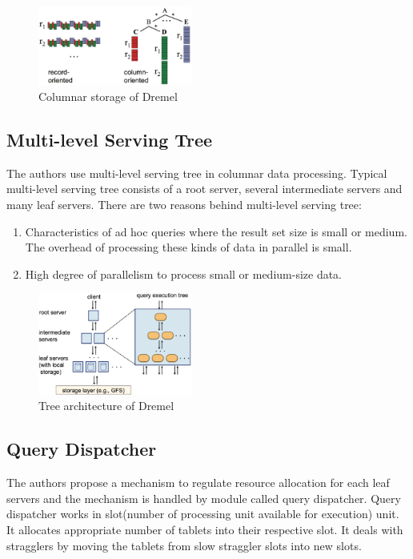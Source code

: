 \documentclass[twocolumn]{article}
\newcommand{\be}{\begin{enumerate}}
\newcommand{\ee}{\end{enumerate}}
\newcommand{\ii}{\item}
\begin{document}
\begin{figure}[htb]
        \centering
        \includegraphics[width=0.45\textwidth]{column-oriented.png}
        \caption{Columnar storage of Dremel}
        \label{fig:column-oriented}
\end{figure}

\subsection{Multi-level Serving Tree}
The authors use multi-level serving tree in columnar data processing. Typical multi-level serving tree consists of a root server, several intermediate servers and many leaf servers. There are two reasons behind multi-level serving tree:
\be
\ii Characteristics of ad hoc queries where the result set size is small or medium. The overhead of processing these kinds of data in parallel is small.
\ii High degree of parallelism to process small or medium-size data.
\ee
\begin{figure}[htb]
        \centering
        \includegraphics[width=0.45\textwidth]{query-execution-tree.png}
        \caption{Tree architecture of Dremel}
        \label{fig:tree}
\end{figure}

\subsection{Query Dispatcher}
The authors propose a mechanism to regulate resource allocation for each leaf servers and the mechanism is handled by module called query dispatcher. Query dispatcher works in slot(number of processing unit available for execution) unit. It allocates appropriate number of tablets into their respective slot. It deals with stragglers by moving the tablets from slow straggler slots into new slots.
\end{document}
